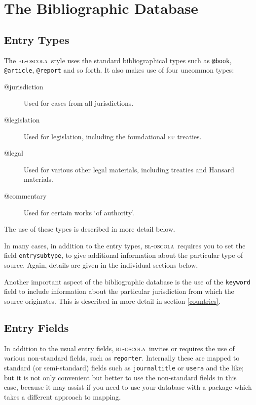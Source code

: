 \documentclass[a5paper,fontsize=9pt,DIV=1]{scrartcl}
\newcommand{\oscola}{\textsc{bl-oscola}}
\begin{document}
\section{The Bibliographic Database}

\subsection{Entry Types}

The \oscola\ style uses the standard bibliographical types such as
\texttt{@book}, \texttt{@article}, \texttt{@report} and so forth. It
also makes use of four uncommon types:
\begin{description}
\item[@jurisdiction] Used for cases from all jurisdictions.
\item[@legislation] Used for legislation, including the foundational \textsc{eu} treaties.
\item[@legal] Used for various other legal materials, including treaties and Hansard materials.
\item[@commentary] Used for certain works `of authority'.
\end{description}
The use of these types is described in more detail below.

In many cases, in addition to the entry types, \oscola\ requires you
to set the field \texttt{entrysubtype}, to give additional information
about the particular type of source. Again, details are given in the
individual sections below.

Another important aspect of the bibliographic database is the use of
the \texttt{keyword} field to include information about the particular
jurisdiction from which the source originates. This is described in
more detail in section \ref{countries}.

\subsection{Entry Fields}

In addition to the usual entry fields, \oscola\ invites or requires
the use of various non-standard fields, such as
\texttt{reporter}. Internally these are mapped to standard (or
semi-standard) fields such as \texttt{journaltitle} or \texttt{usera}
and the like; but it is not only convenient but better to use the
non-standard fields in this case, because it may assist if you need to
use your database with a package which takes a different approach to
mapping.
\end{document}
